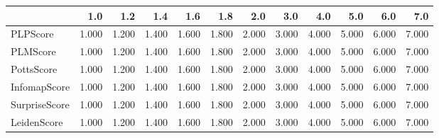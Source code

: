 \begin{tabular}{lrrrrrrrrrrr}
\toprule
{} &   1.0 &   1.2 &   1.4 &   1.6 &   1.8 &   2.0 &   3.0 &   4.0 &   5.0 &   6.0 &   7.0 \\
\midrule
PLPScore      & 1.000 & 1.200 & 1.400 & 1.600 & 1.800 & 2.000 & 3.000 & 4.000 & 5.000 & 6.000 & 7.000 \\
PLMScore      & 1.000 & 1.200 & 1.400 & 1.600 & 1.800 & 2.000 & 3.000 & 4.000 & 5.000 & 6.000 & 7.000 \\
PottsScore    & 1.000 & 1.200 & 1.400 & 1.600 & 1.800 & 2.000 & 3.000 & 4.000 & 5.000 & 6.000 & 7.000 \\
InfomapScore  & 1.000 & 1.200 & 1.400 & 1.600 & 1.800 & 2.000 & 3.000 & 4.000 & 5.000 & 6.000 & 7.000 \\
SurpriseScore & 1.000 & 1.200 & 1.400 & 1.600 & 1.800 & 2.000 & 3.000 & 4.000 & 5.000 & 6.000 & 7.000 \\
LeidenScore   & 1.000 & 1.200 & 1.400 & 1.600 & 1.800 & 2.000 & 3.000 & 4.000 & 5.000 & 6.000 & 7.000 \\
\bottomrule
\end{tabular}

